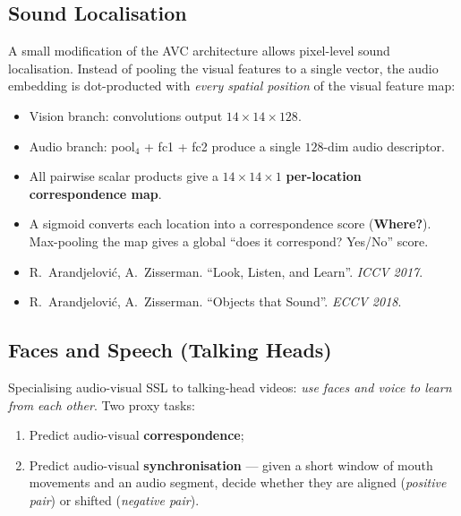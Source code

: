 \documentclass[11pt,a4paper]{article}
\theoremstyle{definition}
\theoremstyle{plain}
\theoremstyle{remark}
\begin{document}
\subsection{Sound Localisation}

A small modification of the AVC architecture allows pixel-level sound localisation. Instead of pooling the visual features to a single vector, the audio embedding is dot-producted with \emph{every spatial position} of the visual feature map:

\begin{itemize}
    \item Vision branch: convolutions output $14\times 14\times 128$.
    \item Audio branch: pool$_4$ + fc1 + fc2 produce a single $128$-dim audio descriptor.
    \item All pairwise scalar products give a $14\times 14\times 1$ \textbf{per-location correspondence map}.
    \item A sigmoid converts each location into a correspondence score (\textbf{Where?}). Max-pooling the map gives a global ``does it correspond? Yes/No'' score.
\end{itemize}

\begin{tcolorbox}[colback=blue!5!white,colframe=blue!60!black,title={References}]
\begin{itemize}[leftmargin=*]
    \item R.\ Arandjelović, A.\ Zisserman. ``Look, Listen, and Learn''. \textit{ICCV 2017}.
    \item R.\ Arandjelović, A.\ Zisserman. ``Objects that Sound''. \textit{ECCV 2018}.
\end{itemize}
\end{tcolorbox}

\subsection{Faces and Speech (Talking Heads)}

Specialising audio-visual SSL to talking-head videos: \emph{use faces and voice to learn from each other}. Two proxy tasks:

\begin{enumerate}
    \item Predict audio-visual \textbf{correspondence};
    \item Predict audio-visual \textbf{synchronisation} --- given a short window of mouth movements and an audio segment, decide whether they are aligned (\emph{positive pair}) or shifted (\emph{negative pair}).
\end{enumerate}
\end{document}
